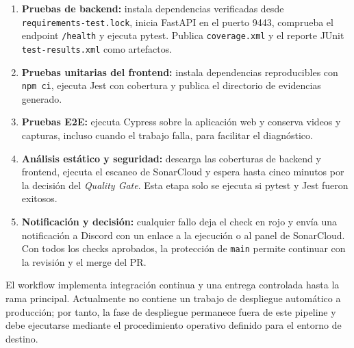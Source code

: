 \begingroup
\small
\begin{enumerate}
    \item \textbf{Pruebas de backend:} instala dependencias verificadas desde \texttt{requirements-test.lock}, inicia FastAPI en el puerto 9443, comprueba el endpoint \texttt{/health} y ejecuta pytest. Publica \texttt{coverage.xml} y el reporte JUnit \texttt{test-results.xml} como artefactos.
    \item \textbf{Pruebas unitarias del frontend:} instala dependencias reproducibles con \texttt{npm ci}, ejecuta Jest con cobertura y publica el directorio de evidencias generado.
    \item \textbf{Pruebas E2E:} ejecuta Cypress sobre la aplicación web y conserva videos y capturas, incluso cuando el trabajo falla, para facilitar el diagnóstico.
    \item \textbf{Análisis estático y seguridad:} descarga las coberturas de backend y frontend, ejecuta el escaneo de SonarCloud y espera hasta cinco minutos por la decisión del \textit{Quality Gate}. Esta etapa solo se ejecuta si pytest y Jest fueron exitosos.
    \item \textbf{Notificación y decisión:} cualquier fallo deja el check en rojo y envía una notificación a Discord con un enlace a la ejecución o al panel de SonarCloud. Con todos los checks aprobados, la protección de \texttt{main} permite continuar con la revisión y el merge del PR.
\end{enumerate}

El workflow implementa integración continua y una entrega controlada hasta la rama principal. Actualmente no contiene un trabajo de despliegue automático a producción; por tanto, la fase de despliegue permanece fuera de este pipeline y debe ejecutarse mediante el procedimiento operativo definido para el entorno de destino.
\endgroup
